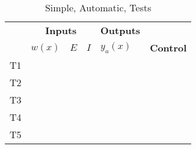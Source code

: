 \documentclass[12pt, titlepage]{article}
\begin{document}
\begin{longtable}[c]{|l|lll|l|l|}
    \caption{Simple, Automatic, Tests}
    \label{tab:simple_automatic_tests}                                                                                                                                                                                                                         \\
    \hline
    \rowcolor{lightgray}
    \cellcolor{lightgray}                              & \multicolumn{3}{c|}{\cellcolor{lightgray}\textbf{Inputs}} & \textbf{Outputs}                             & \cellcolor{lightgray}                                                                      \\ \cline{2-5}
    \rowcolor{lightgray}
    \multirow{-2}{*}{\cellcolor{lightgray}\textbf{ID}} & \multicolumn{1}{c|}{\cellcolor{lightgray}$w(x)$}           & \multicolumn{1}{c|}{\cellcolor{lightgray}$E$} & $I$                   & $y_a(x)$ & \multirow{-2}{*}{\cellcolor{lightgray}\textbf{Control}} \\ \hline
    \endfirsthead
    \endhead
    T1                                                 & \multicolumn{1}{c|}{}                                     & \multicolumn{1}{l|}{}                        &                       &          &                                                         \\ \hline
    T2                                                 & \multicolumn{1}{c|}{}                                     & \multicolumn{1}{l|}{}                        &                       &          &                                                         \\ \hline
    T3                                                 & \multicolumn{1}{c|}{}                                     & \multicolumn{1}{l|}{}                        &                       &          &                                                         \\ \hline
    T4                                                 & \multicolumn{1}{c|}{}                                     & \multicolumn{1}{l|}{}                        &                       &          &                                                         \\ \hline
    T5                                                 & \multicolumn{1}{c|}{}                                     & \multicolumn{1}{l|}{}                        &                       &          &                                                         \\ \hline

\end{longtable}
\end{document}
